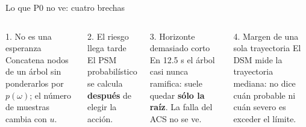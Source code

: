 \documentclass[aspectratio=169,10pt]{beamer}
\newcommand{\key}[1]{{\color{USMBlue}\bfseries #1}}
\begin{document}
\begin{frame}{Lo que P0 no ve: cuatro brechas}
\begin{columns}[T]
\begin{block}{1. No es una esperanza}
Concatena nodos de un árbol sin ponderarlos por $p(\omega)$; el número de muestras cambia con $u$.
\end{block}
\begin{block}{2. El riesgo llega tarde}
El PSM probabilístico se calcula \key{después} de elegir la acción.
\end{block}
\begin{block}{3. Horizonte demasiado corto}
En 12.5 s el árbol casi nunca ramifica: suele quedar \key{sólo la raíz}. La falla del ACS no se ve.
\end{block}
\begin{block}{4. Margen de una sola trayectoria}
El DSM mide la trayectoria mediana: no dice cuán probable ni cuán severo es exceder el límite.
\end{block}
\end{columns}
\vspace{.05cm}
\begin{center}
\end{center}
\end{frame}
\end{document}
